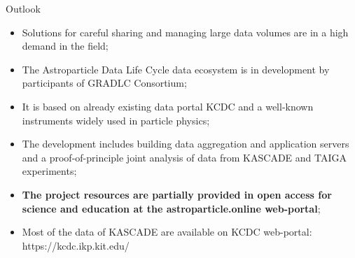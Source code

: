 \begin{frame}{Outlook}
    \begin{itemize}
      \setlength{\itemsep}{0pt}
	\item Solutions for careful sharing and managing large data volumes are in a high demand in the field;
        \item The Astroparticle Data Life Cycle data ecosystem is in development by participants of GRADLC Consortium;
        \item It is based on already existing data portal KCDC and a well-known instruments widely used in particle physics;
        \item The development includes building data aggregation and application servers and a proof-of-principle joint analysis of data from KASCADE and TAIGA experiments;
        \item \textbf{The project resources are partially provided in open access for science and education at the \textcolor{kit-blue70}{astroparticle.online} web-portal};
        \item Most of the data of KASCADE are available on KCDC web-portal: \textcolor{kit-blue70}{https://kcdc.ikp.kit.edu/}


    \end{itemize}
\end{frame}

